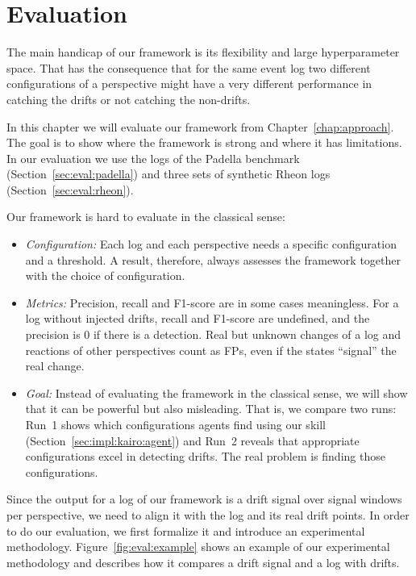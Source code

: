 \chapter{Evaluation}
\label{chap:eval}
The main handicap of our framework is its flexibility and large hyperparameter space. That has the consequence that for the same event log two different configurations of a perspective might have a very different performance in catching the drifts or not catching the non-drifts.

In this chapter we will evaluate our framework from Chapter~\ref{chap:approach}. The goal is to show where the framework is strong and where it has limitations. In our evaluation we use the logs of the Padella benchmark (Section~\ref{sec:eval:padella}) and three sets of synthetic Rheon logs (Section~\ref{sec:eval:rheon}).

Our framework is hard to evaluate in the classical sense:
\begin{itemize}
	\item \emph{Configuration:} Each log and each perspective needs a specific configuration and a threshold. A result, therefore, always assesses the framework together with the choice of configuration.
	\item \emph{Metrics:} Precision, recall and F1-score are in some cases meaningless. For a log without injected drifts, recall and F1-score are undefined, and the precision is 0 if there is a detection. Real but unknown changes of a log and reactions of other perspectives count as FPs, even if the states \enquote{signal} the real change.
	\item \emph{Goal:} Instead of evaluating the framework in the classical sense, we will show that it can be powerful but also misleading. That is, we compare two runs: Run~1 shows which configurations agents find using our skill (Section~\ref{sec:impl:kairo:agent}) and Run~2 reveals that appropriate configurations excel in detecting drifts. The real problem is finding those configurations. 
\end{itemize}

Since the output for a log of our framework is a drift signal over signal windows per perspective, we need to align it with the log and its real drift points. In order to do our evaluation, we first formalize it and introduce an experimental methodology. Figure~\ref{fig:eval:example} shows an example of our experimental methodology and describes how it compares a drift signal and a log with drifts.

